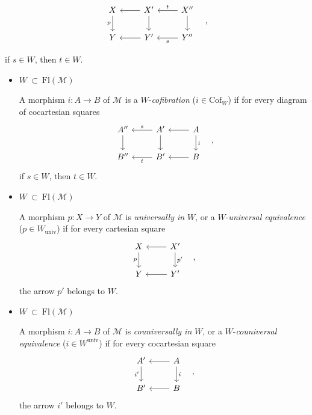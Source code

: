 \documentclass[11pt]{article}
\newcommand{\printedpage}[1]{\marginpar{\footnotesize p.~#1}}
\newcommand{\Fl}{\mathrm{Fl}}
\newcommand{\Mo}{\mathcal{M}}
\begin{document}
\printedpage{59}

\[
\begin{tikzcd}
X \arrow[d, "p"'] & X' \arrow[l] \arrow[d] & X'' \arrow[l, "t"'] \arrow[d] \\
Y & Y' \arrow[l] & Y'' \arrow[l, "s"]
\end{tikzcd}
\quad ,
\]

if $s \in W$, then $t \in W$.

\begin{itemize}
\item[\textbullet] $W \ \subset\ \Fl(\Mo)$

A morphism $i : A \longrightarrow B$ of $\Mo$ is a $W$-\textit{cofibration} ($i \in \mathrm{Cof}_W$) if for every diagram of cocartesian squares
\[
\begin{tikzcd}
A'' \arrow[d] & A' \arrow[l, "s"'] \arrow[d] & A \arrow[l] \arrow[d, "i"] \\
B'' & B' \arrow[l, "t"] & B \arrow[l]
\end{tikzcd}
\quad ,
\]
if $s \in W$, then $t \in W$.

\item[\textbullet] $W \ \subset\ \Fl(\Mo)$

A morphism $p : X \longrightarrow Y$ of $\Mo$ is \textit{universally in} $W$, or a $W$-\textit{universal equivalence} ($p \in W_{\mathrm{univ}}$) if for every cartesian square
\[
\begin{tikzcd}
X \arrow[d, "p"'] & X' \arrow[l] \arrow[d, "p'"] \\
Y & Y' \arrow[l]
\end{tikzcd}
\quad ,
\]
the arrow $p'$ belongs to $W$.

\item[\textbullet] $W \ \subset\ \Fl(\Mo)$

A morphism $i : A \longrightarrow B$ of $\Mo$ is \textit{couniversally in} $W$, or a $W$-\textit{couniversal equivalence} ($i \in W^{\mathrm{univ}}$) if for every cocartesian square
\[
\begin{tikzcd}
A' \arrow[d, "i'"'] & A \arrow[l] \arrow[d, "i"] \\
B' & B \arrow[l]
\end{tikzcd}
\quad ,
\]
the arrow $i'$ belongs to $W$.
\end{itemize}

\printedpage{60}
\end{document}
